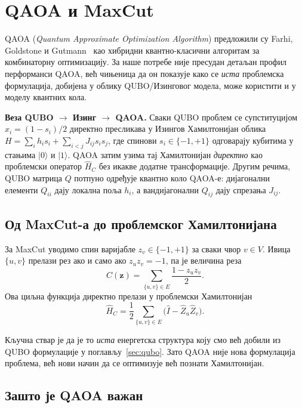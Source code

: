 \section{QAOA и MaxCut}
\label{sec:qaoa}

QAOA (\emph{Quantum Approximate Optimization Algorithm}) предложили су
Farhi, Goldstone и Gutmann~\cite{farhi2014} као хибридни квантно-класични алгоритам за
комбинаторну оптимизацију. За наше потребе није
пресудан детаљан профил перформанси QAOA, већ чињеница да он показује
како се \emph{иста} проблемска формулација, добијена у облику
QUBO/Изинговог модела, може користити и у моделу квантних кола.

\textbf{Веза QUBO $\to$ Изинг $\to$ QAOA.}
Сваки QUBO проблем
се супституцијом $x_i = (1-s_i)/2$ директно пресликава у Изингов
Хамилтонијан облика
$H = \sum_i h_i s_i + \sum_{i<j} J_{ij} s_i s_j$,
где спинови $s_i \in \{-1,+1\}$ одговарају кубитима у стањима
$|0\rangle$ и $|1\rangle$.
QAOA затим узима тај Хамилтонијан \emph{директно} као проблемски
оператор $\hat{H}_C$ без икакве додатне трансформације.
Другим речима, QUBO матрица $Q$ потпуно одређује квантно коло QAOA-е:
дијагонални елементи $Q_{ii}$ дају локална поља $h_i$,
а вандијагонални $Q_{ij}$ дају спрезања $J_{ij}$.

\subsection{Од MaxCut-а до проблемског Хамилтонијана}

За MaxCut уводимо спин варијабле $z_v \in \{-1,+1\}$ за сваки чвор
$v \in V$. Ивица $\{u,v\}$ прелази рез ако и само ако $z_u z_v = -1$,
па је величина реза
\[
  C(\mathbf{z}) = \sum_{\{u,v\}\in E} \frac{1-z_u z_v}{2}.
\]
Ова циљна функција директно прелази у проблемски Хамилтонијан
\[
  \hat{H}_C = \frac{1}{2}\sum_{\{u,v\}\in E}\bigl(\hat{I}-\hat{Z}_u\hat{Z}_v\bigr).
\]

Кључна ствар је да је то \emph{иста} енергетска структура коју смо већ
добили из QUBO формулације у поглављу~\ref{sec:qubo}. Зато QAOA није
нова формулација проблема, већ нови начин да се оптимизује већ познати
Хамилтонијан.


\subsection{Зашто је QAOA важан}

